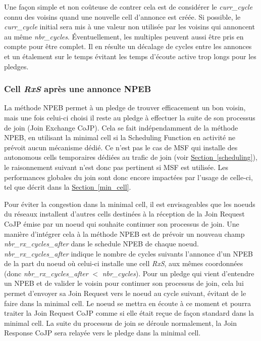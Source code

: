 \documentclass[]{report}
\newcommand{\wordlink}[2]{\hyperref[#2]{#1~\ref{#2}}}
\begin{document}
Une façon simple et non coûteuse de contrer cela est de considérer le \textit{curr\_cycle} connu des voisins quand une nouvelle cell d'annonce est créée. Si possible, le \textit{curr\_cycle} initial sera mis à une valeur non utilisée par les voisins qui annoncent au même \textit{nbr\_cycles}. Éventuellement, les multiples peuvent aussi être pris en compte pour être complet. Il en résulte un décalage de cycles entre les annonces et un étalement sur le temps évitant les temps d'écoute active trop longs pour les pledges.
~\\
\subsubsection{Cell \textit{RxS} après une annonce NPEB}

La méthode NPEB permet à un pledge de trouver efficacement un bon voisin, mais une fois celui-ci choisi il reste au pledge à effectuer la suite de son processus de join (Join Exchange CoJP). Cela se fait indépendamment de la méthode NPEB, en utilisant la minimal cell si la Scheduling Function en activité ne prévoit aucun mécanisme dédié. Ce n'est pas le cas de MSF qui installe des autonomous cells temporaires dédiées au trafic de join (voir \wordlink{Section}{scheduling}), le raisonnement suivant n'est donc pas pertinent si MSF est utilisée. Les performances globales du join sont donc encore impactées par l'usage de celle-ci, tel que décrit dans la \wordlink{Section}{min_cell}.\\

\newpage

Pour éviter la congestion dans la minimal cell, il est envisageables que les noeuds du réseaux installent d'autres cells destinées à la réception de la Join Request CoJP émise par un noeud qui souhaite continuer son processus de join. Une manière d'intégrer cela à la méthode NPEB est de prévoir un nouveau champ \textit{nbr\_rx\_cycles\_after} dans le schedule NPEB de chaque noeud. \textit{nbr\_rx\_cycles\_after} indique le nombre de cycles suivants l'annonce d'un NPEB de la part du noeud où celui-ci installe une cell \textit{RxS}, aux mêmes coordonnées (donc \textit{nbr\_rx\_cycles\_after} $<$ \textit{nbr\_cycles}). Pour un pledge qui vient d'entendre un NPEB et de valider le voisin pour continuer son processus de join, cela lui permet d'envoyer sa Join Request vers le noeud au cycle suivant, évitant de le faire dans la minimal cell. Le noeud se mettra en écoute à ce moment et pourra traiter la Join Request CoJP comme si elle était reçue de façon standard dans la minimal cell. La suite du processus de join se déroule normalement, la Join Response CoJP sera relayée vers le pledge dans la minimal cell.\\
\end{document}
